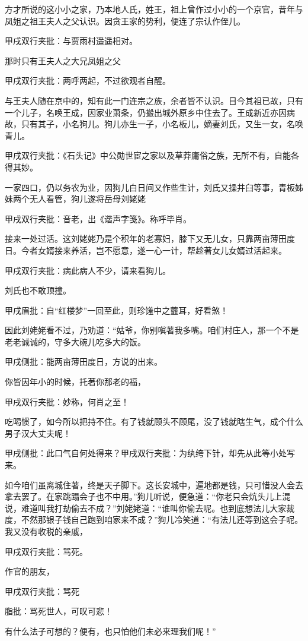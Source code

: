\begin{parag}
    方才所说的这小小之家，乃本地人氏，姓王，祖上曾作过小小的一个京官，昔年与凤姐之祖王夫人之父认识。因贪王家的势利，便连了宗认作侄儿。\begin{note}甲戌双行夹批：与贾雨村遥遥相对。\end{note}那时只有王夫人之大兄凤姐之父\begin{note}甲戌双行夹批：两呼两起，不过欲观者自醒。\end{note}与王夫人随在京中的，知有此一门连宗之族，余者皆不认识。目今其祖已故，只有一个儿子，名唤王成，因家业萧条，仍搬出城外原乡中住去了。王成新近亦因病故，只有其子，小名狗儿。狗儿亦生一子，小名板儿，嫡妻刘氏，又生一女，名唤青儿。\begin{note}甲戌双行夹批：《石头记》中公勋世宦之家以及草莽庸俗之族，无所不有，自能各得其妙。\end{note}一家四口，仍以务农为业，因狗儿白日间又作些生计，刘氏又操井臼等事，青板姊妹两个无人看管，狗儿遂将岳母刘姥姥\begin{note}甲戌双行夹批：音老，出《谐声字笺》。称呼毕肖。\end{note}接来一处过活。这刘姥姥乃是个积年的老寡妇，膝下又无儿女，只靠两亩薄田度日。今者女婿接来养活，岂不愿意，遂一心一计，帮趁著女儿女婿过活起来。
\end{parag}


\begin{parag}
    \begin{note}甲戌双行夹批：病此病人不少，请来看狗儿。\end{note}刘氏也不敢顶撞。\begin{note}甲戌眉批：自“红楼梦”一回至此，则珍馐中之虀耳，好看煞！\end{note}因此刘姥姥看不过，乃劝道：“姑爷，你别嗔著我多嘴。咱们村庄人，那一个不是老老诚诚的，守多大碗儿吃多大的饭。\begin{note}甲戌侧批：能两亩薄田度日，方说的出来。\end{note}你皆因年小的时候，托著你那老的福，\begin{note}甲戌双行夹批：妙称，何肖之至！\end{note}吃喝惯了，如今所以把持不住。有了钱就顾头不顾尾，没了钱就瞎生气，成个什么男子汉大丈夫呢！\begin{note}甲戌侧批：此口气自何处得来？甲戌双行夹批：为纨绔下针，却先从此等小处写来。\end{note}如今咱们虽离城住著，终是天子脚下。这长安城中，遍地都是钱，只可惜没人会去拿去罢了。在家跳蹋会子也不中用。”狗儿听说，便急道：“你老只会炕头儿上混说，难道叫我打劫偷去不成？”刘姥姥道：“谁叫你偷去呢。也到底想法儿大家裁度，不然那银子钱自己跑到咱家来不成？”狗儿冷笑道：“有法儿还等到这会子呢。我又没有收税的亲戚，\begin{note}甲戌双行夹批：骂死。\end{note}作官的朋友，\begin{note}甲戌双行夹批：骂死\end{note}\begin{note}脂批：骂死世人，可叹可悲！\end{note}有什么法子可想的？便有，也只怕他们未必来理我们呢！”
\end{parag}


